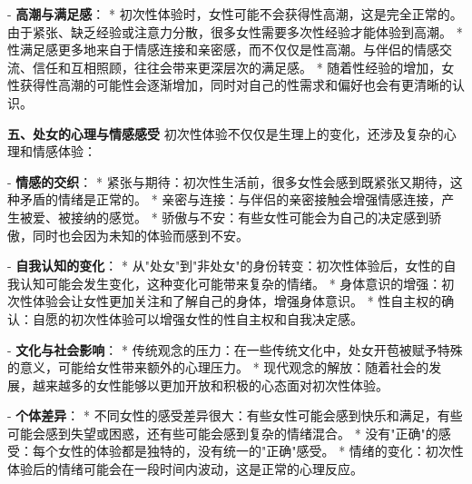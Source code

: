 \begin{enumerate}
  - \textbf{高潮与满足感}：
    * 初次性体验时，女性可能不会获得性高潮，这是完全正常的。由于紧张、缺乏经验或注意力分散，很多女性需要多次性经验才能体验到高潮。
    * 性满足感更多地来自于情感连接和亲密感，而不仅仅是性高潮。与伴侣的情感交流、信任和互相照顾，往往会带来更深层次的满足感。
    * 随着性经验的增加，女性获得性高潮的可能性会逐渐增加，同时对自己的性需求和偏好也会有更清晰的认识。

  \textbf{五、处女的心理与情感感受}
  初次性体验不仅仅是生理上的变化，还涉及复杂的心理和情感体验：

  - \textbf{情感的交织}：
    * 紧张与期待：初次性生活前，很多女性会感到既紧张又期待，这种矛盾的情绪是正常的。
    * 亲密与连接：与伴侣的亲密接触会增强情感连接，产生被爱、被接纳的感觉。
    * 骄傲与不安：有些女性可能会为自己的决定感到骄傲，同时也会因为未知的体验而感到不安。

  - \textbf{自我认知的变化}：
    * 从"处女"到"非处女"的身份转变：初次性体验后，女性的自我认知可能会发生变化，这种变化可能带来复杂的情绪。
    * 身体意识的增强：初次性体验会让女性更加关注和了解自己的身体，增强身体意识。
    * 性自主权的确认：自愿的初次性体验可以增强女性的性自主权和自我决定感。

  - \textbf{文化与社会影响}：
    * 传统观念的压力：在一些传统文化中，处女开苞被赋予特殊的意义，可能给女性带来额外的心理压力。
    * 现代观念的解放：随着社会的发展，越来越多的女性能够以更加开放和积极的心态面对初次性体验。

  - \textbf{个体差异}：
    * 不同女性的感受差异很大：有些女性可能会感到快乐和满足，有些可能会感到失望或困惑，还有些可能会感到复杂的情绪混合。
    * 没有"正确"的感受：每个女性的体验都是独特的，没有统一的"正确"感受。
    * 情绪的变化：初次性体验后的情绪可能会在一段时间内波动，这是正常的心理反应。


\end{enumerate}
